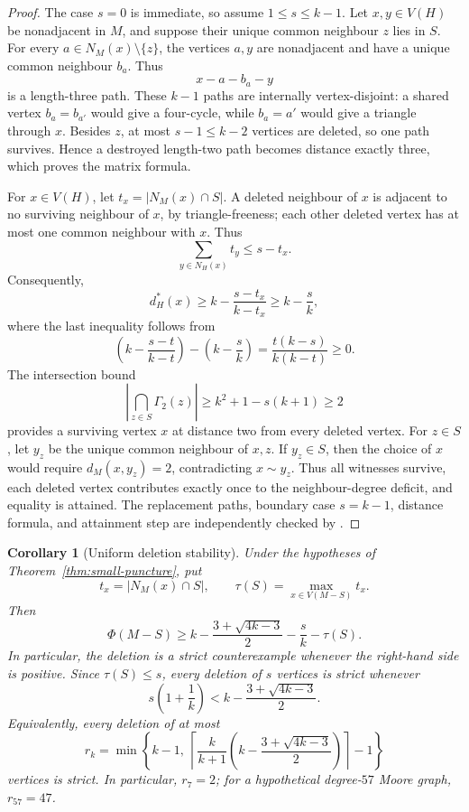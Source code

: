 \documentclass[a4paper,10pt,reqno]{amsart}
\theoremstyle{plain}
\newtheorem{corollary}[theorem]{Corollary}
\theoremstyle{definition}
\theoremstyle{remark}
\newcommand{\resultbox}[1]{\boxed{#1}}
\newcommand{\RepoTag}{v2.3.0}
\newcommand{\codefile}[1]{%
  \href{https://github.com/SamPetkov/wow284/blob/\RepoTag/#1}{\path{#1}}}
\begin{document}
\begin{proof}
The case \(s=0\) is immediate, so assume \(1\le s\le k-1\).  Let
\(x,y\in V(H)\) be nonadjacent in \(M\), and suppose their unique common
neighbour \(z\) lies in \(S\).  For every
\(a\in N_M(x)\setminus\{z\}\), the vertices \(a,y\) are nonadjacent and
have a unique common neighbour \(b_a\).  Thus
\[
 x-a-b_a-y
\]
is a length-three path.  These \(k-1\) paths are internally vertex-disjoint:
a shared vertex \(b_a=b_{a'}\) would give a four-cycle, while
\(b_a=a'\) would give a triangle through \(x\).  Besides \(z\), at most
\(s-1\le k-2\) vertices are deleted, so one path survives.  Hence a destroyed
length-two path becomes distance exactly three, which proves the matrix formula.

For \(x\in V(H)\), let \(t_x=|N_M(x)\cap S|\).  A deleted neighbour of
\(x\) is adjacent to no surviving neighbour of \(x\), by triangle-freeness;
each other deleted vertex has at most one common neighbour with \(x\).  Thus
\[
 \sum_{y\in N_H(x)}t_y\le s-t_x.
\]
Consequently,
\[
 d_H^*(x)
 \ge k-\frac{s-t_x}{k-t_x}
 \ge k-\frac{s}{k},
\]
where the last inequality follows from
\[
 \left(k-\frac{s-t}{k-t}\right)-\left(k-\frac{s}{k}\right)
 =\frac{t(k-s)}{k(k-t)}\ge0.
\]
The intersection bound
\[
 \left|\bigcap_{z\in S}\Gamma_2(z)\right|
 \ge k^2+1-s(k+1)\ge2
\]
provides a surviving vertex \(x\) at distance two from every deleted vertex.
For \(z\in S\), let \(y_z\) be the unique common neighbour of \(x,z\).  If
\(y_z\in S\), then the choice of \(x\) would require
\(d_M(x,y_z)=2\), contradicting \(x\sim y_z\).  Thus all witnesses survive,
each deleted vertex contributes exactly once to the neighbour-degree deficit,
and equality is attained.  The
replacement paths, boundary case \(s=k-1\), distance formula, and attainment
step are independently checked by
\codefile{scripts/verify_proof_audit_12_small_puncture.py}.
\end{proof}

\begin{corollary}[Uniform deletion stability]
\label{cor:uniform-deletion}
Under the hypotheses of Theorem~\ref{thm:small-puncture}, put
\[
 t_x=|N_M(x)\cap S|,
 \qquad
 \tau(S)=\max_{x\in V(M-S)}t_x.
\]
Then
\[
 \resultbox{
 \Phi(M-S)\ge
 k-\frac{3+\sqrt{4k-3}}2-\frac{s}{k}-\tau(S).
 }
\]
In particular, the deletion is a strict counterexample whenever the
right-hand side is positive.  Since \(\tau(S)\le s\), every deletion of
\(s\) vertices is strict whenever
\[
 \resultbox{
 s\left(1+\frac1k\right)
 <k-\frac{3+\sqrt{4k-3}}2.
 }
\]
Equivalently, every deletion of at most
\[
 r_k=\min\left\{
 k-1,\
 \left\lceil
 \frac{k}{k+1}\left(k-\frac{3+\sqrt{4k-3}}2\right)
 \right\rceil-1
 \right\}
\]
vertices is strict.  In particular, \(r_7=2\); for a hypothetical
degree-\(57\) Moore graph, \(r_{57}=47\).
\end{corollary}
\end{document}
